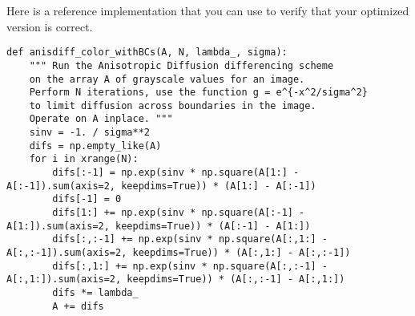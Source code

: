 \begin{problem}
Here is a reference implementation that you can use to verify that your optimized version is correct.
\begin{lstlisting}
def anisdiff_color_withBCs(A, N, lambda_, sigma):
    """ Run the Anisotropic Diffusion differencing scheme
    on the array A of grayscale values for an image.
    Perform N iterations, use the function g = e^{-x^2/sigma^2}
    to limit diffusion across boundaries in the image.
    Operate on A inplace. """
    sinv = -1. / sigma**2
    difs = np.empty_like(A)
    for i in xrange(N):
        difs[:-1] = np.exp(sinv * np.square(A[1:] - A[:-1]).sum(axis=2, keepdims=True)) * (A[1:] - A[:-1])
        difs[-1] = 0
        difs[1:] += np.exp(sinv * np.square(A[:-1] - A[1:]).sum(axis=2, keepdims=True)) * (A[:-1] - A[1:])
        difs[:,:-1] += np.exp(sinv * np.square(A[:,1:] - A[:,:-1]).sum(axis=2, keepdims=True)) * (A[:,1:] - A[:,:-1])
        difs[:,1:] += np.exp(sinv * np.square(A[:,:-1] - A[:,1:]).sum(axis=2, keepdims=True)) * (A[:,:-1] - A[:,1:])
        difs *= lambda_
        A += difs
\end{lstlisting}
\end{problem}
%
%
%
